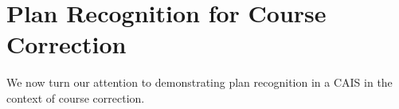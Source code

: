 \section{Plan Recognition for Course Correction}

We now turn our attention to demonstrating plan recognition in a CAIS in the context of course
correction.